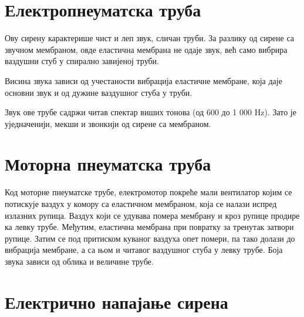 \documentclass{report}
\begin{document}
\section{Електропнеуматска труба}

Ову сирену карактерише чист и леп звук, сличан труби. За разлику од сирене са 
звучном мембраном, овде еластична мембрана не одаје звук, већ само вибрира ваздушни 
стуб у спирално завијеној труби.


Висина звука зависи од учестаности вибрација еластичне мембране, 
која даје основни звук и од дужине ваздушног стуба у труби. 

Звук ове трубе садржи читав спектар виших тонова (од 600 до 1 000 Hz). 
Зато је уједначенији, мекши и звонкији од сирене са мембраном. 



\section{Моторна пнеуматска труба}

Код моторне пнеуматске трубе, електромотор 
покреће мали вентилатор којим се потискује ваздух у 
комору са еластичном мембраном, која се налази испред излазних 
рупица. Ваздух који се удувава помера мембрану и кроз рупице продире 
ка левку трубе. Међутим, еластична мембрана при повратку за тренутак 
затвори рупице. Затим се под притиском куваног ваздуха опет помери, па 
тако долази до вибрација мембране, а са њом и читавог ваздушног стуба у 
левку трубе. Боја звука зависи од облика и величине трубе.


\section{Електрично напајање сирена}

\end{document}
